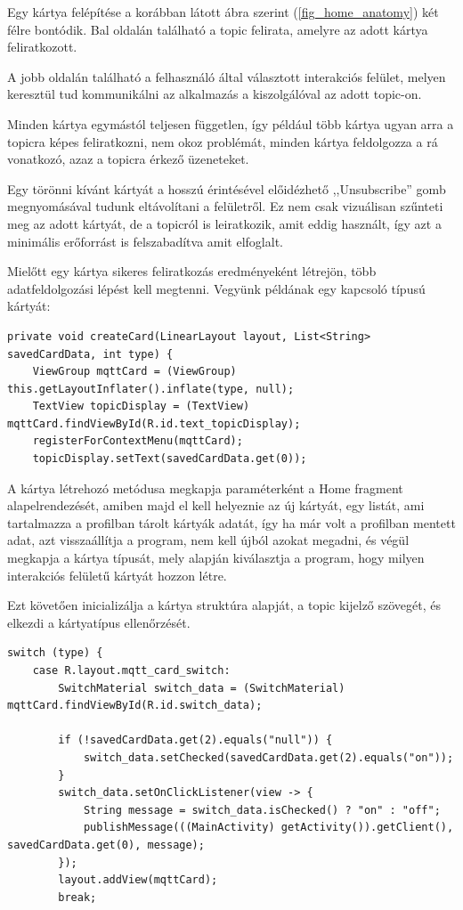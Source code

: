 \documentclass[
]{thesis-ekf}
\theoremstyle{definition}
\theoremstyle{remark}
\begin{document}
Egy kártya felépítése a korábban látott ábra szerint (\ref{fig_home_anatomy}) két félre bontódik.
Bal oldalán található a topic felirata, amelyre az adott kártya feliratkozott. 

A jobb oldalán található
a felhasználó által választott interakciós felület, melyen keresztül tud kommunikálni az alkalmazás a
kiszolgálóval az adott topic-on. 

Minden kártya egymástól teljesen független, így például több kártya ugyan
arra a topicra képes feliratkozni, nem okoz problémát, minden kártya feldolgozza a rá vonatkozó,
azaz a topicra érkező üzeneteket.

Egy törönni kívánt kártyát a hosszú érintésével előidézhető ,,Unsubscribe'' gomb megnyomásával tudunk
eltávolítani a felületről. Ez nem csak vizuálisan szűnteti meg az adott kártyát, de a topicról is
leiratkozik, amit eddig használt, így azt a minimális erőforrást is felszabadítva amit elfoglalt. 

Mielőtt egy kártya sikeres feliratkozás eredményeként létrejön, több adatfeldolgozási lépést kell megtenni. 
Vegyünk példának egy kapcsoló típusú kártyát:


\lstset{language=Java}  
\begin{lstlisting}[frame=single]
private void createCard(LinearLayout layout, List<String> savedCardData, int type) {
    ViewGroup mqttCard = (ViewGroup) this.getLayoutInflater().inflate(type, null);
    TextView topicDisplay = (TextView) mqttCard.findViewById(R.id.text_topicDisplay);
    registerForContextMenu(mqttCard);
    topicDisplay.setText(savedCardData.get(0));
\end{lstlisting}

A kártya létrehozó metódusa megkapja paraméterként a Home fragment alapelrendezését, amiben majd el kell
helyeznie az új kártyát, egy listát, ami tartalmazza a profilban tárolt kártyák adatát, így ha már
volt a profilban mentett adat, azt visszaállítja a program, nem kell újból azokat megadni, és végül
megkapja a kártya típusát, mely alapján kiválasztja a program, hogy milyen interakciós felületű kártyát
hozzon létre.

Ezt követően inicializálja a kártya struktúra alapját, a topic kijelző szövegét, és elkezdi a kártyatípus ellenőrzését.

\lstset{language=Java}  
\begin{lstlisting}[frame=single]
switch (type) {
	case R.layout.mqtt_card_switch:
		SwitchMaterial switch_data = (SwitchMaterial) mqttCard.findViewById(R.id.switch_data);

		if (!savedCardData.get(2).equals("null")) {
			switch_data.setChecked(savedCardData.get(2).equals("on"));
		}
		switch_data.setOnClickListener(view -> {
			String message = switch_data.isChecked() ? "on" : "off";
			publishMessage(((MainActivity) getActivity()).getClient(), savedCardData.get(0), message);
		});
		layout.addView(mqttCard);
		break;
\end{lstlisting}
\end{document}
